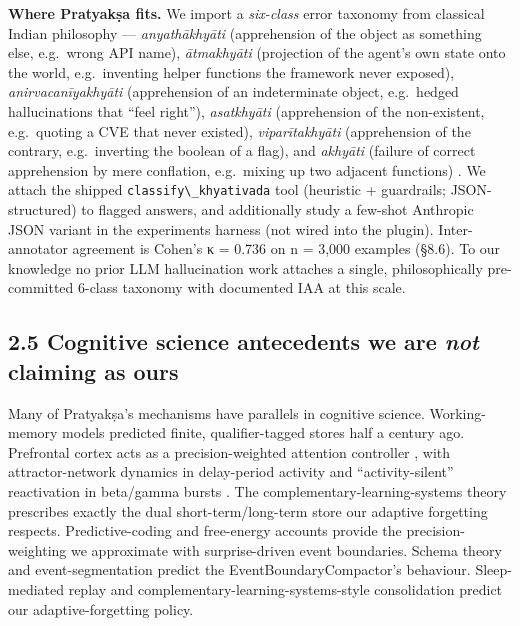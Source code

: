 \textbf{Where Pratyakṣa fits.} We import a \emph{six-class} error taxonomy from classical Indian philosophy --- \emph{anyathākhyāti} (apprehension of the object as something else, e.g.~wrong API name), \emph{ātmakhyāti} (projection of the agent's own state onto the world, e.g.~inventing helper functions the framework never exposed), \emph{anirvacanīyakhyāti} (apprehension of an indeterminate object, e.g.~hedged hallucinations that ``feel right''), \emph{asatkhyāti} (apprehension of the non-existent, e.g.~quoting a CVE that never existed), \emph{viparītakhyāti} (apprehension of the contrary, e.g.~inverting the boolean of a flag), and \emph{akhyāti} (failure of correct apprehension by mere conflation, e.g.~mixing up two adjacent functions) \citep{ram2007error, matilal1986perception, bilimoria2018epistemology}. We attach the shipped \passthrough{\lstinline!classify\_khyativada!} tool (heuristic + guardrails; JSON-structured) to flagged answers, and additionally study a few-shot Anthropic JSON variant in the experiments harness (not wired into the plugin). Inter-annotator agreement is Cohen's κ \citep{cohen1960kappa, landis1977kappa} = 0.736 on n = 3,000 examples (§8.6). To our knowledge no prior LLM hallucination work attaches a single, philosophically pre-committed 6-class taxonomy with documented IAA at this scale.

\subsection{\texorpdfstring{2.5 Cognitive science antecedents we are \emph{not} claiming as ours}{2.5 Cognitive science antecedents we are not claiming as ours}}\label{cognitive-science-antecedents-we-are-not-claiming-as-ours}

Many of Pratyakṣa's mechanisms have parallels in cognitive science. Working-memory models \citep{baddeley1974wm, baddeley2000episodic, cowan2001focus, miller1956magical} predicted finite, qualifier-tagged stores half a century ago. Prefrontal cortex acts as a precision-weighted attention controller \citep{miller2001integrative, corbetta2002dorsalventral, desimone1995biased, reynolds2009gain}, with attractor-network dynamics in delay-period activity \citep{compte2000attractor, funahashi1989delay} and ``activity-silent'' reactivation in beta/gamma bursts \citep{stokes2015activitysilent, lundqvist2016gamma}. The complementary-learning-systems theory \citep{mcclelland1995cls, kumaran2016cls} prescribes exactly the dual short-term/long-term store our adaptive forgetting respects. Predictive-coding and free-energy accounts \citep{rao1999predictive, friston2010fep, feldman2010precision} provide the precision-weighting we approximate with surprise-driven event boundaries. Schema theory \citep{bartlett1932remembering, ghosh2014schema, vankesteren2012slimm} and event-segmentation \citep{zacks2007event, baldassano2017nested} predict the EventBoundaryCompactor's behaviour. Sleep-mediated replay \citep{wilson1994replay, ambrose2016reward, diekelmann2010sleep, buzsaki2015ripples} and complementary-learning-systems-style consolidation \citep{richards2017persistence} predict our adaptive-forgetting policy.

